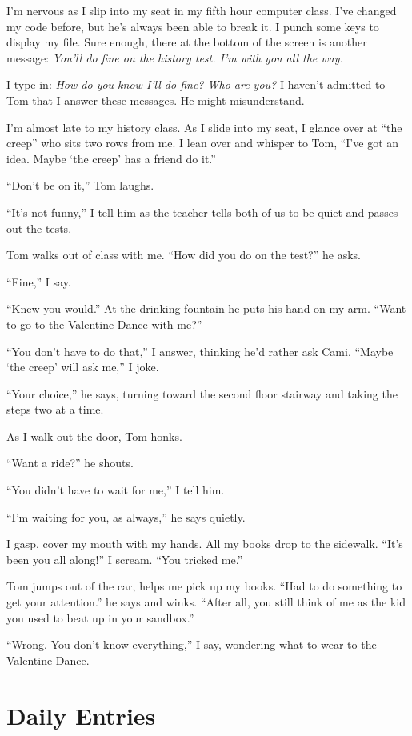 \documentclass[twoside,10pt]{book}
\begin{document}
I'm nervous as I slip into my seat in my fifth hour computer class. I've
changed my code before, but he's always been able to break it. I punch
some keys to display my file. Sure enough, there at the bottom of the
screen is another message: \emph{You'll do fine on the history test. I'm
with you all the way.}

I type in: \emph{How do you know I'll do fine? Who are you?} I haven't
admitted to Tom that I answer these messages. He might misunderstand.

I'm almost late to my history class. As I slide into my seat, I glance
over at ``the creep'' who sits two rows from me. I lean over and whisper
to Tom, ``I've got an idea. Maybe `the creep' has a friend do it.''

``Don't be on it,'' Tom laughs.

``It's not funny,'' I tell him as the teacher tells both of us to be
quiet and passes out the tests.

Tom walks out of class with me. ``How did you do on the test?'' he asks.

``Fine,'' I say.

``Knew you would.'' At the drinking fountain he puts his hand on my arm.
``Want to go to the Valentine Dance with me?''

``You don't have to do that,'' I answer, thinking he'd rather ask Cami.
``Maybe `the creep' will ask me,'' I joke.

``Your choice,'' he says, turning toward the second floor stairway and
taking the steps two at a time.

As I walk out the door, Tom honks.

``Want a ride?'' he shouts.

``You didn't have to wait for me,'' I tell him.

``I'm waiting for you, as always,'' he says quietly.

I gasp, cover my mouth with my hands. All my books drop to the sidewalk.
``It's been you all along!'' I scream. ``You tricked me.''

Tom jumps out of the car, helps me pick up my books. ``Had to do
something to get your attention.'' he says and winks. ``After all, you
still think of me as the kid you used to beat up in your sandbox.''

``Wrong. You don't know everything,'' I say, wondering what to wear to
the Valentine Dance.



\cleardoublepage
\chapter{Daily Entries}
\end{document}
